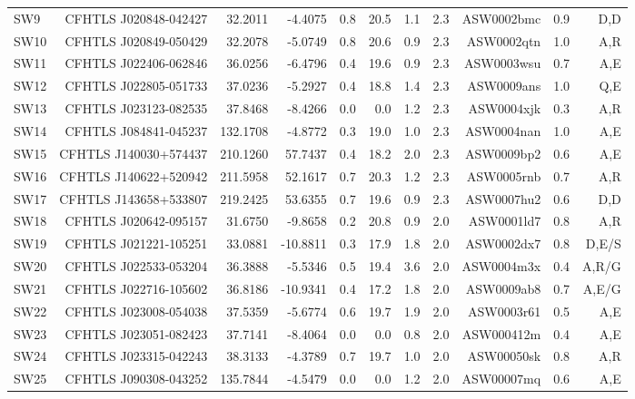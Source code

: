 \documentclass[useAMS,usenatbib,a4paper]{mn2e}
\begin{document}
\begin{center}
\begin{longtable}{lrrrrrrrrrr}
 SW9 & CFHTLS J020848-042427 &   32.2011 &   -4.4075 &  0.8 & 20.5 &  1.1 &  2.3 & ASW0002bmc &  0.9  &  D,D   \\
SW10 & CFHTLS J020849-050429 &   32.2078 &   -5.0749 &  0.8 & 20.6 &  0.9 &  2.3 & ASW0002qtn &  1.0  &  A,R   \\
SW11 & CFHTLS J022406-062846 &   36.0256 &   -6.4796 &  0.4 & 19.6 &  0.9 &  2.3 & ASW0003wsu &  0.7  &  A,E   \\
SW12 & CFHTLS J022805-051733 &   37.0236 &   -5.2927 &  0.4 & 18.8 &  1.4 &  2.3 & ASW0009ans &  1.0  &  Q,E   \\
SW13 & CFHTLS J023123-082535 &   37.8468 &   -8.4266 &  0.0 &  0.0 &  1.2 &  2.3 & ASW0004xjk &  0.3  &  A,R   \\
SW14 & CFHTLS J084841-045237 &  132.1708 &   -4.8772 &  0.3 & 19.0 &  1.0 &  2.3 & ASW0004nan &  1.0  &  A,E   \\
SW15 & CFHTLS J140030+574437 &  210.1260 &   57.7437 &  0.4 & 18.2 &  2.0 &  2.3 & ASW0009bp2 &  0.6  &  A,E   \\
SW16 & CFHTLS J140622+520942 &  211.5958 &   52.1617 &  0.7 & 20.3 &  1.2 &  2.3 & ASW0005rnb &  0.7  &  A,R   \\
SW17 & CFHTLS J143658+533807 &  219.2425 &   53.6355 &  0.7 & 19.6 &  0.9 &  2.3 & ASW0007hu2 &  0.6  &  D,D   \\
SW18 & CFHTLS J020642-095157 &   31.6750 &   -9.8658 &  0.2 & 20.8 &  0.9 &  2.0 & ASW0001ld7 &  0.8  &  A,R   \\
SW19 & CFHTLS J021221-105251 &   33.0881 &  -10.8811 &  0.3 & 17.9 &  1.8 &  2.0 & ASW0002dx7 &  0.8  &  D,E/S   \\
SW20 & CFHTLS J022533-053204 &   36.3888 &   -5.5346 &  0.5 & 19.4 &  3.6 &  2.0 & ASW0004m3x &  0.4  &  A,R/G   \\
SW21 & CFHTLS J022716-105602 &   36.8186 &  -10.9341 &  0.4 & 17.2 &  1.8 &  2.0 & ASW0009ab8 &  0.7  &  A,E/G   \\
SW22 & CFHTLS J023008-054038 &   37.5359 &   -5.6774 &  0.6 & 19.7 &  1.9 &  2.0 & ASW0003r61 &  0.5  &  A,E   \\
SW23 & CFHTLS J023051-082423 &   37.7141 &   -8.4064 &  0.0 &  0.0 &  0.8 &  2.0 & ASW000412m &  0.4  &  A,E   \\
SW24 & CFHTLS J023315-042243 &   38.3133 &   -4.3789 &  0.7 & 19.7 &  1.0 &  2.0 & ASW00050sk &  0.8  &  A,R   \\
SW25 & CFHTLS J090308-043252 &  135.7844 &   -4.5479 &  0.0 &  0.0 &  1.2 &  2.0 & ASW00007mq &  0.6  &  A,E   \\

\end{longtable}
\end{center}
\end{document}
